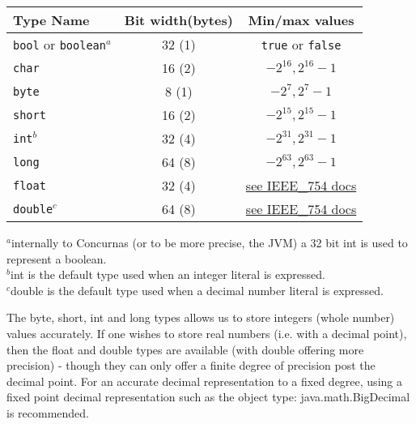 \documentclass[conc-doc]{subfiles}
\begin{document}
\begin{table}[H]
	\begin{tabular*}{\textwidth}{@{\extracolsep{\fill}}lcc}
		\hline
		Type Name& Bit width(bytes)& Min/max values\\
		\hline
		\lstinline!bool! or \lstinline!boolean!$^{a}$& 32 (1) &\lstinline!true! or \lstinline!false!\\
		\lstinline!char!& 16 (2) &${-2^{16}, 2^{16} - 1}$\\
		\lstinline!byte!& 8 (1) &${-2^7, 2^7 - 1}$\\
		\lstinline!short!& 16 (2) &${-2^{15}, 2^{15} - 1}$\\
		\lstinline!int!$^{b}$& 32 (4) &${-2^{31}, 2^{31} - 1}$\\
		\lstinline!long!& 64 (8) &${-2^{63}, 2^{63} - 1}$\\
		\lstinline!float!& 32 (4) &\href{https://en.wikipedia.org/wiki/IEEE_754}{see IEEE\_754 docs}\\
		\lstinline!double!$^{c}$& 64 (8) &\href{https://en.wikipedia.org/wiki/IEEE_754}{see IEEE\_754 docs}\\
		\hline
	\end{tabular*}
	\begin{tablenotes}
		$^{a}$internally to Concurnas (or to be more precise, the JVM) a 32 bit int is used to represent a boolean.\\
		$^{b}$int is the default type used when an integer literal is expressed.\\
		$^{c}$double is the default type used when a decimal number literal is expressed.
	\end{tablenotes}
\end{table}

The byte, short, int and long types allows us to store integers (whole number) values accurately. If one wishes to store real numbers (i.e. with a decimal point), then the float and double types are available (with double offering more precision) - though they can only offer a finite degree of precision post the decimal point. For an accurate decimal representation to a fixed degree, using a fixed point decimal representation such as the object type: java.math.BigDecimal is recommended.
\end{document}
